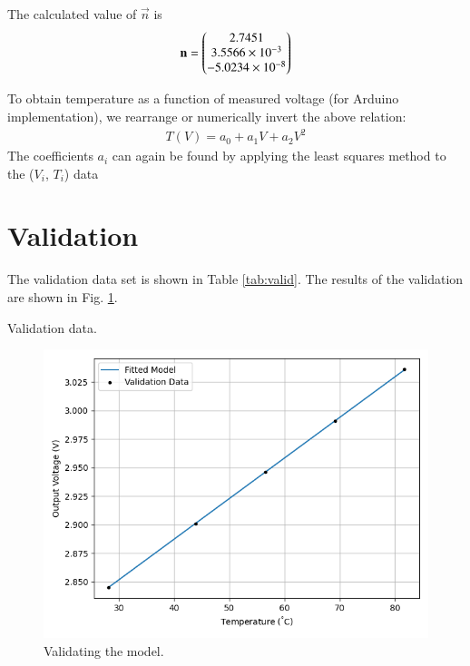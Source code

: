 \documentclass[journal,12pt,twocolumn]{IEEEtran}
\begin{document}
The calculated value of $\vec{n}$ is
\begin{align}
    \boldsymbol{\mathbf{n}} = \begin{pmatrix}2.7451\\3.5566\times10^{-3}\\-5.0234\times10^{-8}\end{pmatrix}
    \label{eq:opt-theta}
\end{align}

To obtain temperature as a function of measured voltage (for Arduino implementation),
we rearrange or numerically invert the above relation:
\begin{align}
T(V) = a_0 + a_1V + a_2V^2
\end{align}
The coefficients $a_i$ can again be found by applying the least squares method to the ($V_i$, $T_i$)
data
\section{Validation}
The validation data set is shown in Table \ref{tab:valid}. The results of the
validation are shown in Fig. \ref{fig:valid}.
\begin{table}[H]
    \centering
    
    \caption{Validation data.}
    \label{tab:valid}
\end{table}
\begin{figure}[H]
    \centering
    \includegraphics[width=\columnwidth]{figs/valid.png}
    \caption{Validating the model.}
    \label{fig:valid}
\end{figure}
\end{document}
